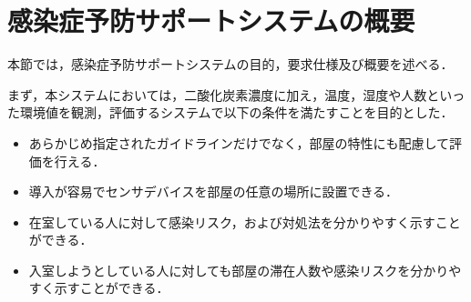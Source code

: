 

\section{感染症予防サポートシステムの概要}

本節では，感染症予防サポートシステムの目的，要求仕様及び概要を述べる．

まず，本システムにおいては，二酸化炭素濃度に加え，温度，湿度や人数といった環境値を観測，評価するシステムで以下の条件を満たすことを目的とした．
\begin{itemize}
    \item あらかじめ指定されたガイドラインだけでなく，部屋の特性にも配慮して評価を行える．
    \item 導入が容易でセンサデバイスを部屋の任意の場所に設置できる．
    \item 在室している人に対して感染リスク，および対処法を分かりやすく示すことができる．
    \item 入室しようとしている人に対しても部屋の滞在人数や感染リスクを分かりやすく示すことができる．
\end{itemize}

